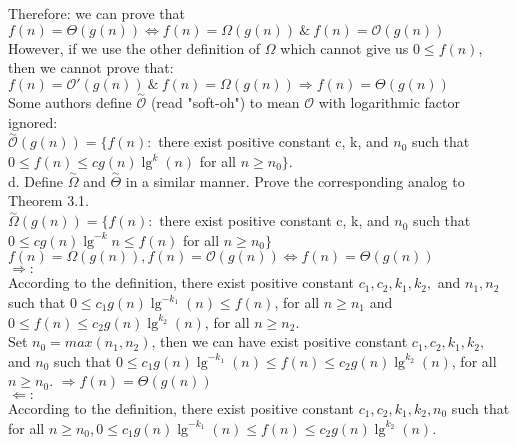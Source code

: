 \documentclass[12pt,letterpaper]{article}
\begin{document}
\begin{enumerate}
Therefore: we can prove that $f(n) = \Theta(g(n)) \Leftrightarrow f(n) = \Omega(g(n)) \ \& \ f(n) = \mathcal{O}(g(n)) $\\

However, if we use the other definition of $\Omega$ which cannot give us $0 \le f(n)$, then we cannot prove that: \\

$f(n) = \mathcal{O}'(g(n)) \ \& \ f(n) = \Omega(g(n)) \Rightarrow f(n) = \Theta(g(n)) $ \\

Some authors define $\stackrel{\sim}{\mathcal{O}}$ (read "soft-oh") to mean $\mathcal{O}$ with logarithmic factor ignored:\\

$\stackrel{\sim}{\mathcal{O}}(g(n)) = \{ f(n):$ there exist positive constant c, k, and $n_0$ such that $0 \le f(n) \le c g(n) \lg ^k (n) $ for all $n \ge n_0 \}.$\\

d. Define $\stackrel{\sim}{\Omega}$ and $\stackrel{\sim}{\Theta}$ in a similar manner. Prove the corresponding analog to Theorem 3.1.\\

$\stackrel{\sim}{\Omega}(g(n)) = \{ f(n):$ there exist positive constant c, k, and $n_0$ such that $0 \le c g(n) \lg^{-k} n \le f(n) $ for all $n \ge n_0 \}$ \\

$f(n) = \Omega(g(n)), f(n) = \mathcal{O}(g(n)) \Leftrightarrow f(n) = \Theta(g(n))$ \\

$\Rightarrow:$ \\

According to the definition, there exist positive constant $c_1, c_2, k_1, k_2,$ and $n_1, n_2$ such that $0 \le c_1 g(n) \lg ^{-k_1} (n) \le  f(n)$, for all $n \ge n_1$ and $0 \le f(n) \le c_2 g(n) \lg ^{k_2} (n)$, for all $n \ge n_2$. \\

Set $n_0 = max(n_1, n_2)$, then we can have exist positive constant $c_1, c_2, k_1, k_2,$ and $n_0$ such that $0 \le c_1 g(n) \lg ^{-k_1} (n) \le  f(n) \le c_2 g(n) \lg ^{k_2} (n)$, for all $n \ge n_0$. $\Rightarrow f(n) = \Theta(g(n))$ \\

$\Leftarrow:$ \\

According to the definition, there exist positive constant $c_1, c_2, k_1, k_2, n_0$ such that for all $n \ge n_0, 0 \le c_1 g(n) \lg ^{-k_1} (n) \le f(n) \le c_2 g(n) \lg ^{k_2} (n)$. \\


\end{enumerate}
\end{document}
